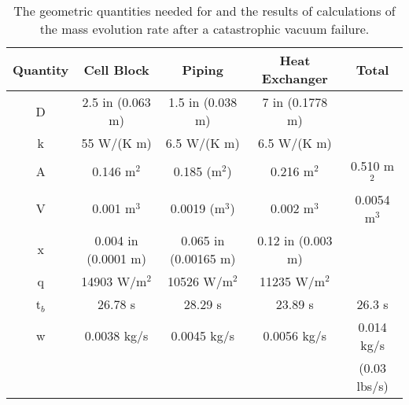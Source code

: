{\begin{table}[htb]
\begin{center}
\begin{tabular}{|c|c|c|c|c|} \hline
Quantity & Cell Block & Piping & Heat Exchanger & Total \\ \hline
D & 2.5 in (0.063 m) & 1.5 in (0.038 m) &7 in (0.1778 m) & \\ \hline
k & 55 W/(K m) & 6.5 W/(K m) & 6.5 W/(K m) & \\ \hline
A & 0.146 m$^2$ & 0.185 (m$^2$) & 0.216 m$^2$ & 0.510 m$^2$ \\ \hline
V & 0.001 m$^3$ & 0.0019 (m$^3$) &0.002 m$^3$ & 0.0054 m$^3$ \\ \hline
x & 0.004 in (0.0001 m) &  0.065 in (0.00165 m) & 0.12 in (0.003 m) & \\ \hline
q & 14903 W/m$^2$ & 10526 W/m$^2$ & 11235 W/m$^2$ & \\ \hline
t$_{b}$ & 26.78 s & 28.29 s & 23.89 s & 26.3 s \\ \hline
w & 0.0038 kg/s & 0.0045 kg/s & 0.0056 kg/s & 0.014 kg/s \\
& & & &  (0.03 lbs/s) \\ \hline 
\end{tabular}
\end{center}
\caption[Cryotarget: Volumes and Geometry]{ The geometric quantities needed for and the results
of calculations of the mass evolution rate after a catastrophic vacuum
failure.} 
\label{ta:geo}
\end{table}

}
